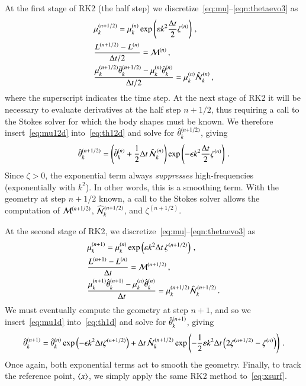 \documentclass[preprint, 10pt]{elsarticle}
\begin{document}
At the first stage of RK2 (the half step) we discretize~\eqref{eq:mu}--\eqref{eqn:thetaevo3} as
\begin{align}
\label{eq:mu12d}
& \mu_k^{(n+1/2)} = \mu_k^{(n)} \exp \left( \varepsilon k^2 \frac{\Delta t}{2}
\zeta^{(n)} \right) \, , \\
\label{eq:L12d}
& \frac{L^{(n+1/2)} - L^{(n)}}{\Delta t/2} = \mathcal{M}^{(n)} \, , \\
\label{eq:th12d}
& \frac{ \mu_k^{(n+1/2)} \hat{\theta}_k^{(n+1/2)} - \mu_k^{(n)} \hat{\theta}_k^{(n)}}{\Delta t/2} 
= \mu_k^{(n)} \hat{\mathcal{N}}_k^{(n)} \, ,
\end{align}
where the superscript indicates the time step. At the next stage of RK2 it will be necessary to evaluate derivatives at the half step $n+1/2$, thus requiring a call to the Stokes solver for which the body shapes must be known. We therefore insert~\eqref{eq:mu12d} into~\eqref{eq:th12d} and solve for $\hat{\theta}_k^{(n+1/2)}$, giving
\begin{align}
\label{eq:th12}
\hat{\theta}_k^{(n+1/2)} = \left( \hat{\theta}_k^{(n)} + \frac{1}{2} \Delta t \, \hat{\mathcal{N}}_k^{(n)} \right)
\exp \left( -\epsilon k^2 \frac{\Delta t}{2} \zeta^{(n)}\right) \, .
\end{align}
Since $\zeta >0$, the exponential term always {\em suppresses} high-frequencies (exponentially with $k^2$). In other words, this is a smoothing term. With the geometry at step $n+1/2$ known, a call to the Stokes solver allows the computation of $\mathcal{M}^{(n+1/2)}$, $\widehat{\NLterm}_k^{(n+1/2)}$, and $\zeta^{(n+1/2)}$.

At the second stage of RK2, we discretize~\eqref{eq:mu}--\eqref{eqn:thetaevo3} as 
\begin{align}
\label{eq:mu1d}
& \mu_k^{(n+1)} = \mu_k^{(n)} \exp \left( \varepsilon k^2 {\Delta t} \,
\zeta^{(n+1/2)} \right) \, , \\
\label{eq:L1d}
& \frac{L^{(n+1)} - L^{(n)}}{\Delta t} = \mathcal{M}^{(n+1/2)} \, , \\
\label{eq:th1d}
& \frac{ \mu_k^{(n+1)} \hat{\theta}_k^{(n+1)} - \mu_k^{(n)} \hat{\theta}_k^{(n)}}{\Delta t} =
\mu_k^{(n+1/2)} \hat{\mathcal{N}}_k^{(n+1/2)} \, .
\end{align}
We must eventually compute the geometry at step $n+1$, and so we insert~\eqref{eq:mu1d} into~\eqref{eq:th1d} and solve for $\hat{\theta}_k^{(n+1)}$, giving
\begin{align}
\hat{\theta}_k^{(n+1)} =  \hat{\theta}_k^{(n)} \exp \left( - \epsilon k^2 \Delta t
\zeta^{(n+1/2)} \right) + \Delta t \, \hat{\mathcal{N}}_k^{(n+1/2)} \exp \left(
- \frac{1}{2} \varepsilon k^2 \Delta t \left( 2 \zeta^{(n+1/2)} - \zeta^{(n)}
\right) \right) \, .
\end{align}
Once again, both exponential terms act to smooth the geometry. Finally, to track the reference point, $\left< x \right>$, we simply apply the same RK2 method to~\eqref{eq:xsurf}.
\end{document}
